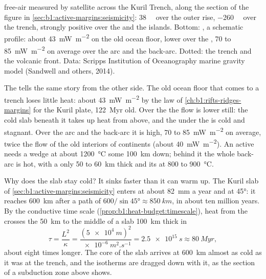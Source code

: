 \begin{omfigure}
{free-air  measured by satellite across the Kuril Trench, along
the section of the figure in \cref{sec:b1:active-margins:seismicity}:
\qty{38}{\milli\gal} over the outer rise, \qty{-260}{\milli\gal} over the
trench, strongly positive over the  and the islands. Bottom: ,
a schematic profile: about \qty{43}{mW.m^{-2}} on the old ocean floor, lower
over the , 70 to \qty{85}{mW.m^{-2}} on average over the arc and the
back-arc. Dotted: the trench and the volcanic front. Data: Scripps
Institution of Oceanography marine gravity model (Sandwell and others, 2014).}
\label{fig:b1:active-margins:profiles}
\end{omfigure}

The  tells the same story from the other side. The old ocean floor
that comes to a trench loses little heat: about \qty{43}{mW.m^{-2}} by the law
of \cref{ch:b1:rifts-ridges-margins} for the Kuril plate, \qty{122}{Myr} old.
Over the  the flow is lower still: the cold slab beneath it takes up
heat from above, and the  under the  is cold and stagnant. Over the arc
and the back-arc it is high, 70 to \qty{85}{mW.m^{-2}} on average, twice the
flow of the old interiors of continents (about \qty{40}{mW.m^{-2}}). An active
 needs a  wedge at about \qty{1200}{\celsius} some
\qty{100}{km} down; behind it the whole back-arc is hot, with a 
only 50 to \qty{60}{km} thick and its  at 800 to \qty{900}{\celsius}.

Why does the slab stay cold? It sinks faster than it can warm up. The Kuril
slab of \cref{sec:b1:active-margins:seismicity} enters at about
\qty{82}{mm} a year and  at \ang{45}: it reaches \qty{600}{km} after a path
of $600/\sin\ang{45} \approx \qty{850}{km}$, in about ten million years. By the
conductive time scale (\cref{prop:b1:heat-budget:timescale}), heat from the
 crosses the \qty{50}{km} to the middle of a slab \qty{100}{km} thick in
\[
  \tau = \frac{L^2}{\kappa} = \frac{(\qty{5e4}{m})^2}{\qty{e-6}{m^2.s^{-1}}}
  = \qty{2.5e15}{s} \approx \qty{80}{Myr},
\]
about eight times longer. The core of the slab arrives at \qty{600}{km} almost as
cold as it was at the trench, and the isotherms are dragged down with it, as
the section of a subduction zone above shows.

